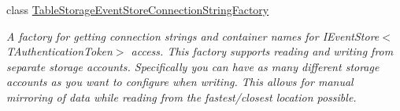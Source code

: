 \begin{DoxyCompactItemize}
class \hyperlink{classCqrs_1_1Azure_1_1BlobStorage_1_1Events_1_1TableStorageEventStoreConnectionStringFactory}{Table\+Storage\+Event\+Store\+Connection\+String\+Factory}
\begin{DoxyCompactList}\small\item\em A factory for getting connection strings and container names for I\+Event\+Store$<$\+T\+Authentication\+Token$>$ access. This factory supports reading and writing from separate storage accounts. Specifically you can have as many different storage accounts as you want to configure when writing. This allows for manual mirroring of data while reading from the fastest/closest location possible. \end{DoxyCompactList}\end{DoxyCompactItemize}
